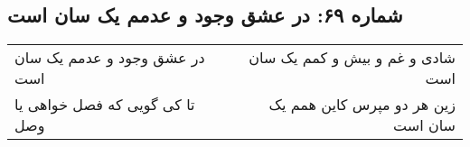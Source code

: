 \begin{center}
\section*{شماره ۶۹: در عشق وجود و عدمم یک سان است}
\label{sec:069}
\begin{longtable}{l p{0.5cm} r}
در عشق وجود و عدمم یک سان است
&&
شادی و غم و بیش و کمم یک سان است
\\
تا کی گویی که فصل خواهی یا وصل
&&
زین هر دو مپرس کاین همم یک سان است
\\
\end{longtable}
\end{center}
